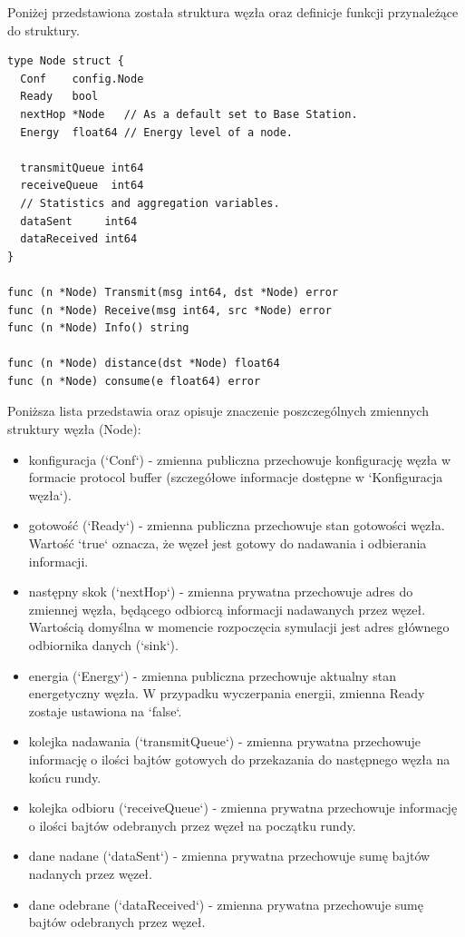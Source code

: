 \documentclass[a4paper,12pt,twoside,openany]{report}
\begin{document}
Poniżej przedstawiona została struktura węzła oraz definicje funkcji przynależące do struktury.

\begin{lstlisting}
type Node struct {
  Conf    config.Node
  Ready   bool
  nextHop *Node   // As a default set to Base Station.
  Energy  float64 // Energy level of a node.

  transmitQueue int64
  receiveQueue  int64
  // Statistics and aggregation variables.
  dataSent     int64
  dataReceived int64
}

func (n *Node) Transmit(msg int64, dst *Node) error
func (n *Node) Receive(msg int64, src *Node) error
func (n *Node) Info() string

func (n *Node) distance(dst *Node) float64
func (n *Node) consume(e float64) error
\end{lstlisting}

Poniższa lista przedstawia oraz opisuje znaczenie poszczególnych zmiennych struktury węzła (Node):

\begin{itemize}
 \item konfiguracja (`Conf`) - zmienna publiczna przechowuje konfigurację węzła w formacie protocol buffer (szczegółowe informacje dostępne w `Konfiguracja węzła`).
 \item gotowość (`Ready`) - zmienna publiczna przechowuje stan gotowości węzła. Wartość `true` oznacza, że węzeł jest gotowy do nadawania i odbierania informacji.
 \item następny skok (`nextHop`) - zmienna prywatna przechowuje adres do zmiennej węzła, będącego odbiorcą informacji nadawanych przez węzeł. Wartością domyślna w momencie
       rozpoczęcia symulacji jest adres głównego odbiornika danych (`sink`).
 \item energia (`Energy`) - zmienna publiczna przechowuje aktualny stan energetyczny węzła. W przypadku wyczerpania energii, zmienna Ready zostaje ustawiona na `false`.
 \item kolejka nadawania (`transmitQueue`) - zmienna prywatna przechowuje informację o ilości bajtów gotowych do przekazania do następnego węzła na końcu rundy.
 \item kolejka odbioru (`receiveQueue`) - zmienna prywatna przechowuje informację o ilości bajtów odebranych przez węzeł na początku rundy.
 \item dane nadane (`dataSent`) - zmienna prywatna przechowuje sumę bajtów nadanych przez węzeł.
 \item dane odebrane (`dataReceived`) - zmienna prywatna przechowuje sumę bajtów odebranych przez węzeł.
\end{itemize}
\end{document}
